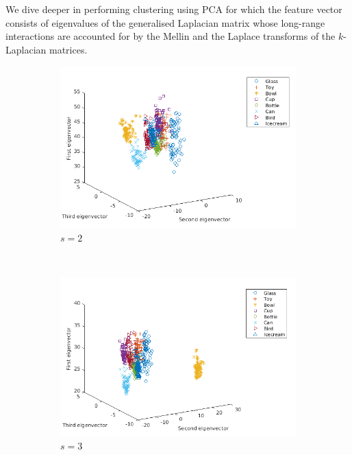 \documentclass[10pt,a4paper]{article}
\theoremstyle{plain}
\theoremstyle{definition}
\begin{document}
We dive deeper in performing clustering using PCA for which the feature vector consists of eigenvalues of the generalised Laplacian matrix whose long-range interactions are accounted for by the Mellin and the Laplace transforms of the $k$-Laplacian matrices.

\begin{figure}[H]
	\centering
	\begin{subfigure}[b]{0.5\textwidth}
		\includegraphics[width= \textwidth]{images/Mellin-s2.png}
		\caption{$s=2$}
		\label{}
	\end{subfigure}~
	\begin{subfigure}[b]{0.5\textwidth}
		\includegraphics[width= \textwidth]{images/Mellin-s3.png}
		\caption{$s=3$}
		\label{}
	\end{subfigure}\\
	\begin{subfigure}[b]{0.5\textwidth}

\end{subfigure}
\end{figure}
\end{document}
